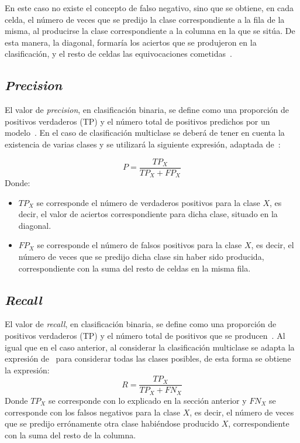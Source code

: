 En este caso no existe el concepto de falso negativo, sino que se obtiene, en cada celda, el número de veces que se predijo la clase correspondiente a la fila de la misma, al producirse la clase correspondiente a la columna en la que se sitúa. De esta manera, la diagonal, formaría los aciertos que se produjeron en la clasificación, y el resto de celdas las equivocaciones cometidas~\cite{kolo2011binary}.

\subsection{\textit{Precision}}
El valor de \textit{precision}, en clasificación binaria, se define como una proporción de positivos verdaderos (TP) y el número total de positivos predichos por un modelo~\cite{FAWCETT2006861}. En el caso de clasificación multiclase se deberá de tener en cuenta la existencia de varias clases y se utilizará la siguiente expresión, adaptada de~\cite{FAWCETT2006861}:

$$P = \frac{TP_X}{TP_X + FP_X} $$
Donde:
\begin{itemize}
	\item $TP_X$ se corresponde el número de verdaderos positivos para la clase $X$, es decir, el valor de aciertos correspondiente para dicha clase, situado en la diagonal.
	\item $FP_X$ se corresponde el número de falsos positivos para la clase $X$, es decir, el número de veces que se predijo dicha clase sin haber sido producida, correspondiente con la suma del resto de celdas en la misma fila.
\end{itemize}

\subsection{\textit{Recall}}
El valor de \textit{recall}, en clasificación binaria, se define como una proporción de positivos verdaderos (TP) y el número total de positivos que se producen~\cite{FAWCETT2006861}. Al igual que en el caso anterior, al considerar la clasificación multiclase se adapta la expresión de~\cite{FAWCETT2006861} para considerar todas las clases posibles, de esta forma se obtiene la expresión:
$$R = \frac{TP_X}{TP_X +FN_X} $$
Donde $TP_X$ se corresponde con lo explicado en la sección anterior y $FN_X$ se corresponde con los falsos negativos para la clase $X$, es decir, el número de veces que se predijo errónamente otra clase habiéndose producido $X$, correspondiente con la suma del resto de la columna. 